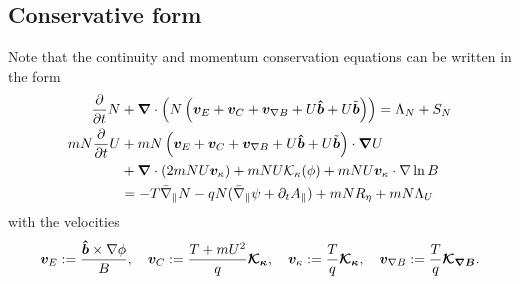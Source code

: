 \subsection{Conservative form}
Note that the continuity and momentum conservation equations can be
written in the form
\begin{align}
\frac{\partial}{\partial t} N &+ {\boldsymbol{\nabla}}\cdot\left( N \left(
    {\boldsymbol{v}}_E + {\boldsymbol{v}}_C + {\boldsymbol{v}}_{\nabla B} + U\bm{\hat{b}} + U\tilde{{\boldsymbol{b}}}\right)\right) = \Lambda_N + S_N \\
mN \frac{\partial}{\partial t} U &+ mN \left(
    {\boldsymbol{v}}_E + {\boldsymbol{v}}_C + {\boldsymbol{v}}_{\nabla B} + U\bm{\hat{b}} + U\tilde{{\boldsymbol{b}}}
    \right)\cdot {\boldsymbol{\nabla}} U  \nonumber \\
    &+ {\boldsymbol{\nabla}} \cdot ( 2mNU {\boldsymbol{v}}_\kappa)
    + mNU\mathcal K_\kappa(\phi)
    + mNU{\boldsymbol{v}}_\kappa \cdot \nabla \ln B \nonumber\\
    &= -T \bar \nabla_\parallel N -qN ( \bar \nabla_\parallel \psi + \partial_t A_\parallel) + mN R_\eta + mN\Lambda_U
\label{}
\end{align}
with the velocities
\begin{align}
{\boldsymbol{v}}_E := \frac{\bm{\hat{b}}\times\nabla\phi}{B},\quad
{\boldsymbol{v}}_C := \frac{T+mU^2}{q}{\boldsymbol{\mathcal K_\kappa}},\quad
{\boldsymbol{v}}_\kappa := \frac{T}{q}{\boldsymbol{\mathcal K_\kappa}},\quad
{\boldsymbol{v}}_{\nabla B} := \frac{T}{q}{\boldsymbol{\mathcal K_{\nabla B}}}.
\label{}
\end{align}
